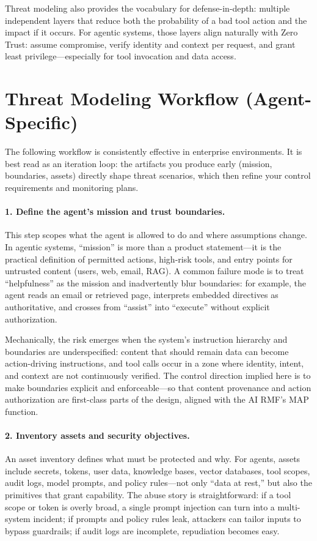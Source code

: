 \begin{TNtwocol}
  Threat modeling also provides the vocabulary for defense-in-depth: multiple independent layers that reduce both the probability of a bad tool action and the impact if it occurs. For agentic systems, those layers align naturally with Zero Trust: assume compromise, verify identity and context per request, and grant least privilege—especially for tool invocation and data access. \cite{nist-sp800-207,cisa-ztmm-v2}

  \section{Threat Modeling Workflow (Agent-Specific)}

  The following workflow is consistently effective in enterprise environments. It is best read as an iteration loop: the artifacts you produce early (mission, boundaries, assets) directly shape threat scenarios, which then refine your control requirements and monitoring plans.

  \paragraph{1. Define the agent's mission and trust boundaries.}
  This step scopes what the agent is allowed to do and where assumptions change. In agentic systems, “mission” is more than a product statement—it is the practical definition of permitted actions, high-risk tools, and entry points for untrusted content (users, web, email, RAG). A common failure mode is to treat “helpfulness” as the mission and inadvertently blur boundaries: for example, the agent reads an email or retrieved page, interprets embedded directives as authoritative, and crosses from “assist” into “execute” without explicit authorization.

  Mechanically, the risk emerges when the system's instruction hierarchy and boundaries are underspecified: content that should remain data can become action-driving instructions, and tool calls occur in a zone where identity, intent, and context are not continuously verified. The control direction implied here is to make boundaries explicit and enforceable—so that content provenance and action authorization are first-class parts of the design, aligned with the AI RMF's MAP function. \cite{nist-airmf-100-1,nist-genai-600-1}

  \paragraph{2. Inventory assets and security objectives.}
  An asset inventory defines what must be protected and why. For agents, assets include secrets, tokens, user data, knowledge bases, vector databases, tool scopes, audit logs, model prompts, and policy rules—not only “data at rest,” but also the primitives that grant capability. The abuse story is straightforward: if a tool scope or token is overly broad, a single prompt injection can turn into a multi-system incident; if prompts and policy rules leak, attackers can tailor inputs to bypass guardrails; if audit logs are incomplete, repudiation becomes easy.


\end{TNtwocol}
